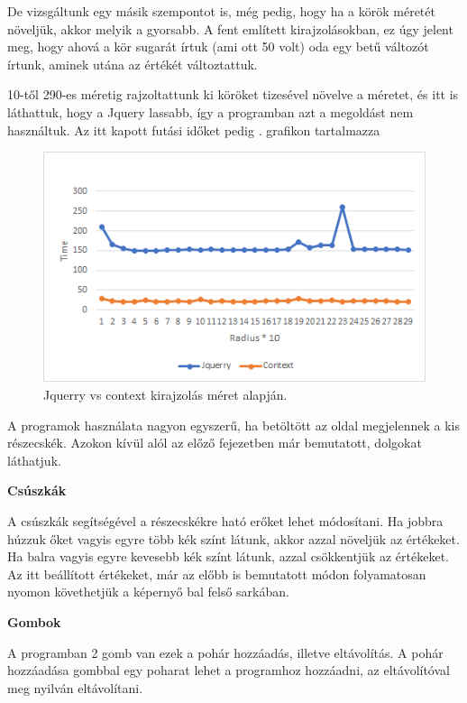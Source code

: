 De vizsgáltunk egy másik szempontot is, még pedig, hogy ha a körök méretét növeljük, akkor melyik a gyorsabb. A fent említett kirajzolásokban, ez úgy jelent meg, hogy ahová a kör sugarát írtuk (ami ott 50 volt) oda egy betű változót írtunk, aminek utána az értékét változtattuk.

10-től 290-es méretig rajzoltattunk ki köröket tizesével növelve a méretet, és itt is láthattuk, hogy a Jquery lassabb, így a programban azt a megoldást nem használtuk. Az itt kapott futási időket pedig . grafikon tartalmazza


\begin{figure}[h]
	\centering
	\includegraphics[scale=1]{images/radius.png}
	\caption{Jquerry vs context kirajzolás méret alapján.}
	\label{fig:radius}
\end{figure}




A programok használata nagyon egyszerű, ha betöltött az oldal megjelennek a kis részecskék. Azokon kívül alól az előző fejezetben  már bemutatott, dolgokat láthatjuk. 

\textbf{Csúszkák}

A csúszkák segítségével a részecskékre ható erőket lehet módosítani. Ha jobbra húzzuk őket vagyis egyre több kék színt látunk, akkor azzal növeljük az értékeket. Ha balra vagyis egyre kevesebb kék színt látunk, azzal csökkentjük az értékeket. Az itt beállított értékeket, már az előbb is bemutatott módon  folyamatosan nyomon követhetjük a képernyő bal felső sarkában. 


\textbf{Gombok}

A programban 2 gomb van ezek a pohár hozzáadás, illetve eltávolítás. A pohár hozzáadása gombbal egy poharat lehet a programhoz hozzáadni, az eltávolítóval meg nyilván eltávolítani. 

